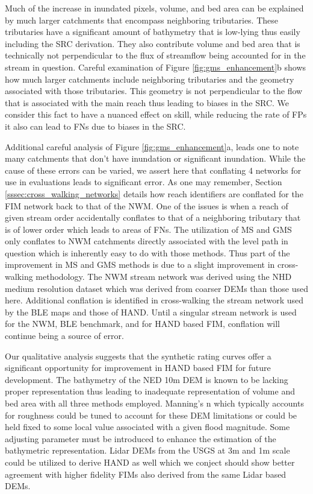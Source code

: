 Much of the increase in inundated pixels, volume, and bed area can be explained by much larger catchments that encompass neighboring tributaries.
These tributaries have a significant amount of bathymetry that is low-lying thus easily including the SRC derivation. 
They also contribute volume and bed area that is technically not perpendicular to the flux of streamflow being accounted for in the stream in question. 
Careful examination of Figure \ref{fig:gms_enhancement}b shows how much larger catchments include neighboring tributaries and the geometry associated with those tributaries. 
This geometry is not perpendicular to the flow that is associated with the main reach thus leading to biases in the SRC.
We consider this fact to have a nuanced effect on skill, while reducing the rate of FPs it also can lead to FNs due to biases in the SRC.

Additional careful analysis of Figure \ref{fig:gms_enhancement}a, leads one to note many catchments that don't have inundation or significant inundation.
While the cause of these errors can be varied, we assert here that conflating 4 networks for use in evaluations leads to significant error.
As one may remember, Section \ref{sssec:cross_walking_networks} details how reach identifiers are conflated for the FIM network back to that of the NWM. 
One of the issues is when a reach of given stream order accidentally conflates to that of a neighboring tributary that is of lower order which leads to areas of FNs.
The utilization of MS and GMS only conflates to NWM catchments directly associated with the level path in question which is inherently easy to do with those methods. 
Thus part of the improvement in MS and GMS methods is due to a slight improvement in cross-walking methodology.
The NWM stream network was derived using the NHD medium resolution dataset which was derived from coarser DEMs than those used here. 
Additional conflation is identified in cross-walking the stream network used by the BLE maps and those of HAND.
Until a singular stream network is used for the NWM, BLE benchmark, and for HAND based FIM, conflation will continue being a source of error.

Our qualitative analysis suggests that the synthetic rating curves offer a significant opportunity for improvement in HAND based FIM for future development.
The bathymetry of the NED 10m DEM is known to be lacking proper representation thus leading to inadequate representation of volume and bed area with all three methods employed.
Manning's n which typically accounts for roughness could be tuned to account for these DEM limitations or could be held fixed to some local value associated with a given flood magnitude.
Some adjusting parameter must be introduced to enhance the estimation of the bathymetric representation.
Lidar DEMs from the USGS at 3m and 1m scale could be utilized to derive HAND as well which we conject should show better agreement with higher fidelity FIMs also derived from the same Lidar based DEMs.

